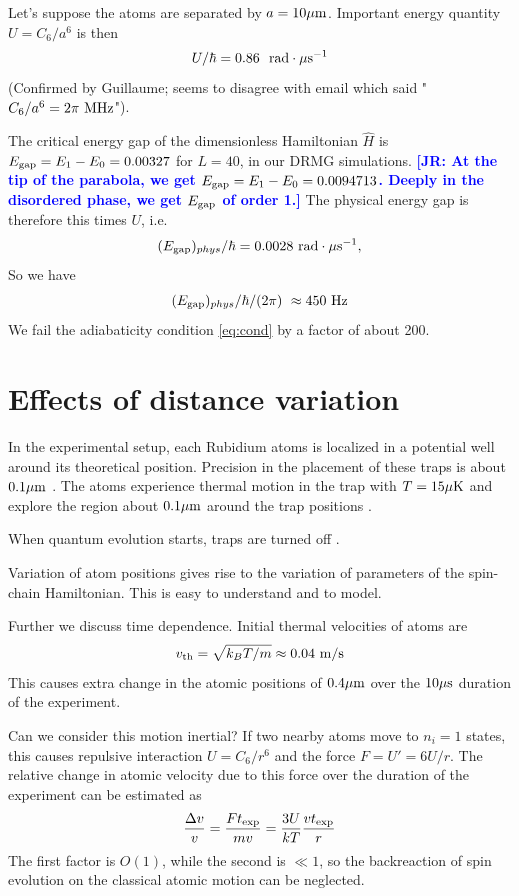 \documentclass[a4paper,11pt]{article}
\newcommand{\beq}{\begin{equation}}
\newcommand{\eeq}{\end{equation}}
\theoremstyle{remark}
\theoremstyle{theorem}
\newcommand{\junchen}[1]{\textcolor{blue}{\textbf{[JR: #1]}}}
\begin{document}
Let's suppose the atoms are separated by $a=10\mu\rm m$. Important energy quantity $U=C_6/a^6$ is then \cite[Tab. 1]{noise-note}
\beq
U/\hbar = 0.86\ {\rm\ rad }\cdot {\rm \mu s}^{-1}
\eeq 
(Confirmed by Guillaume; seems to disagree with email \cite{emailB} which said "$C_6/a^6 = 2\pi\ {\rm MHz}$").

The critical energy gap of the dimensionless Hamiltonian $\hat H$ is $E_{\rm gap} = E_1-E_0=0.00327$ for $L=40$, in our DRMG simulations. \junchen{At the tip of the parabola, we get $E_{\rm gap} = E_1-E_0=0.0094713$. Deeply in the disordered phase, we get $E_{\rm gap}$ of order 1.} The physical energy gap is therefore this times $U$, i.e.
\beq
(E_{\rm gap})_{phys} /\hbar = 0.0028 {\rm\ rad }\cdot {\rm \mu s}^{-1},
\eeq
So we have 
\beq
(E_{\rm gap})_{phys}/\hbar/(2\pi)\  \approx 450\ {\rm Hz}
\eeq
We fail the adiabaticity condition \eqref{eq:cond} by a factor of about 200.


\section{Effects of distance variation}
\label{sec:distvar}


In the experimental setup, each Rubidium atoms is localized in a potential well around its theoretical position. Precision in the placement of these traps is about $0.1\mu\rm m$ \cite{emailV}. The atoms experience thermal motion in the trap with $T=15\mu\rm K$ \cite[Sec.3.B]{noise-note} and explore the region about $0.1\mu\rm m$ around the trap positions \cite{emailV}.

When quantum evolution starts, traps are turned off \cite{noise-note}. 

Variation of atom positions gives rise to the variation of parameters of the spin-chain Hamiltonian. This is easy to understand and to model.

Further we discuss time dependence. Initial thermal velocities of atoms are 
\beq
v_{\rm th}=\sqrt{k_B T/m} \approx 0.04\ {\rm m}/{\rm s}
\eeq
This causes extra change in the atomic positions of $0.4\mu{\rm m}$ over the $10\mu{\rm s}$ duration of the experiment.

Can we consider this motion inertial? If two nearby atoms move to $n_i=1$ states, this causes repulsive interaction $U=C_6/r^6$ and the force $F=U' = 6 U/r$. The relative change in atomic velocity due to this force over the duration of the experiment can be estimated as
\beq
\frac{\Delta v}{v} =  \frac{F t_{\rm exp}}{m v} = \frac{3 U}{kT} \frac {v t_{\rm exp}}{r}
\eeq
The first factor is $O(1)$, while the second is $\ll 1$, so the backreaction of spin evolution on the classical atomic motion can be neglected.
\end{document}

